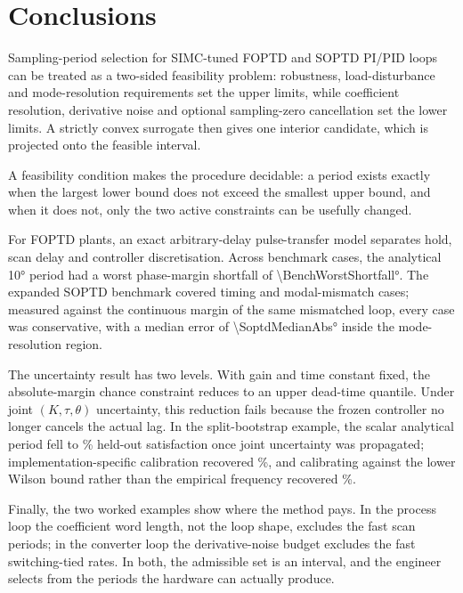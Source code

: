 \documentclass[a4paper,fleqn]{cas-sc}
\theoremstyle{remark}
\begin{document}
\section{Conclusions}
\label{sec:conclusion}
Sampling-period selection for SIMC-tuned FOPTD and SOPTD PI/PID loops can be treated as a two-sided feasibility problem: robustness, load-disturbance and mode-resolution requirements set the upper limits, while coefficient resolution, derivative noise and optional sampling-zero cancellation set the lower limits. A strictly convex surrogate then gives one interior candidate, which is projected onto the feasible interval.

A feasibility condition makes the procedure decidable: a period exists exactly when the largest lower bound does not exceed the smallest upper bound, and when it does not, only the two active constraints can be usefully changed.

For FOPTD plants, an exact arbitrary-delay pulse-transfer model separates hold, scan delay and controller discretisation. Across \BenchN{} benchmark cases, the analytical \ang{10} period had a worst phase-margin shortfall of \ang{\BenchWorstShortfall}. The expanded SOPTD benchmark covered \SoptdN{} timing and modal-mismatch cases; measured against the continuous margin of the same mismatched loop, every case was conservative, with a median error of \ang{\SoptdMedianAbs} inside the mode-resolution region.

The uncertainty result has two levels. With gain and time constant fixed, the absolute-margin chance constraint reduces to an upper dead-time quantile. Under joint $(K,\tau,\theta)$ uncertainty, this reduction fails because the frozen controller no longer cancels the actual lag. In the split-bootstrap example, the scalar analytical period fell to \BootCovJointBEAtScalar\% held-out satisfaction once joint uncertainty was propagated; implementation-specific calibration recovered \BootCovJointBE\%, and calibrating against the lower Wilson bound rather than the empirical frequency recovered \BootCovJointBECons\%.

Finally, the two worked examples show where the method pays. In the process loop the coefficient word length, not the loop shape, excludes the fast scan periods; in the converter loop the derivative-noise budget excludes the fast switching-tied rates. In both, the admissible set is an interval, and the engineer selects from the periods the hardware can actually produce.
\end{document}
